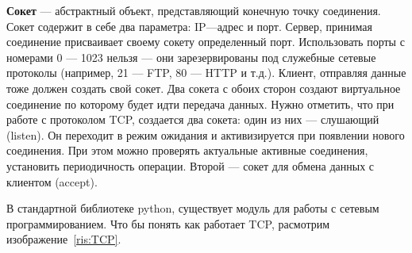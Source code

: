 \documentclass[a4paper]{article}
\begin{document}
\textbf{Сокет} --- абстрактный объект, представляющий конечную точку соединения. Сокет содержит в себе два параметра: IP---адрес и порт. Сервер, принимая соединение присваивает своему сокету определенный порт. Использовать порты с номерами 0 --- 1023 нельзя --- они зарезервированы под служебные сетевые протоколы (например, 21 --- FTP, 80 --- HTTP и т.д.). Клиент, отправляя данные тоже должен создать свой сокет. Два сокета с обоих сторон создают виртуальное соединение по которому будет идти передача данных. Нужно отметить, что при работе с протоколом TCP, создается два сокета: один из них — слушающий (listen). Он переходит в режим ожидания и активизируется при появлении нового соединения. При этом можно проверять актуальные активные соединения, установить периодичность операции. Второй — сокет для обмена данных с клиентом (accept).

В стандартной библиотеке python, существует модуль для работы с сетевым программированием. Что бы понять как работает TCP, расмотрим изображение~\ref{ris:TCP}.

\begin{figure}[h]
\end{figure}
\end{document}

